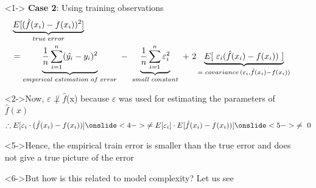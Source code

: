 \begin{frame}
	\begin{itemize}
		\justifying
		\setlength\itemsep{1em}
		\item[]<1-> \textbf{Case 2}: Using training observations\begin{align*}
			&\underbrace{	E[(\hat{f}(x_i)-f(x_i))^2]}_{true\hspace{0.09cm} error}\\&=\underbrace{\frac{1}{n}\sum_{i=1}^{n}(\hat{y_i}-y_i)^2}_{empirical\hspace{0.09cm}estimation\hspace{0.09cm}of\hspace{0.09cm}error}\ -\ \underbrace{\frac{1}{n}\sum_{i=1}^{n}\varepsilon_i^2}_{small\hspace{0.09cm}constant}\ +\ 2\underbrace{E[\ \varepsilon_i (\hat{f}(x_i)-f(x_i))\ ]}_{= \hspace{0.09cm}covariance\hspace{0.05cm}(\varepsilon_i,\hat{f}(x_i)-f(x_i))}
		\end{align*}
		\item[]<2->Now, $\varepsilon\not\perp\hat{f}$(x) because $\varepsilon$ was used for estimating the parameters of $\hat{f}(x)$
		\begin{align*}
			\therefore E[\varepsilon_i \cdot ( \hat{f}(x_i)-f(x_i))]
			\onslide<4->{\ne E[\varepsilon_i] \cdot E[\hat{f}(x_i)-f(x_i))]}
			\onslide<5->{\ne\ 0}
		\end{align*}
							
		\item[]<5->Hence, the empirical train error is smaller than the true error and does not give a true picture of the error
		\item[]<6->But how is this related to model complexity? Let us see
							
							
	\end{itemize}
\end{frame}
